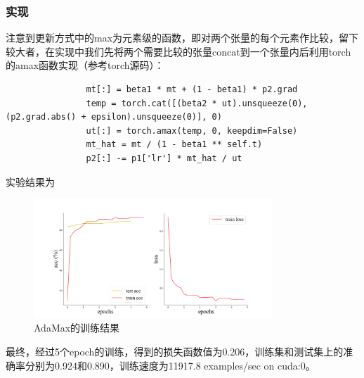 \documentclass[10.5pt,a4paper]{article}%
\begin{document}
            \subsubsection{实现}
            注意到更新方式中的max为元素级的函数，即对两个张量的每个元素作比较，留下较大者，在实现中我们先将两个需要比较的张量concat到一个张量内后利用torch的amax函数实现（参考torch源码）：
            \begin{lstlisting}
                mt[:] = beta1 * mt + (1 - beta1) * p2.grad
                temp = torch.cat([(beta2 * ut).unsqueeze(0), (p2.grad.abs() + epsilon).unsqueeze(0)], 0)
                ut[:] = torch.amax(temp, 0, keepdim=False)
                mt_hat = mt / (1 - beta1 ** self.t)
                p2[:] -= p1['lr'] * mt_hat / ut
            \end{lstlisting}\par
            实验结果为
            \begin{figure}[H]
                \centering
                    \includegraphics[width=0.8\textwidth]{imgs_5e/AdaMax.png}
                  \caption{AdaMax的训练结果}
                  \label{fig:adamax}
            \end{figure}  
             最终，经过5个epoch的训练，得到的损失函数值为0.206，训练集和测试集上的准确率分别为0.924和0.890，训练速度为11917.8 examples/sec on cuda:0。\par
\end{document}
